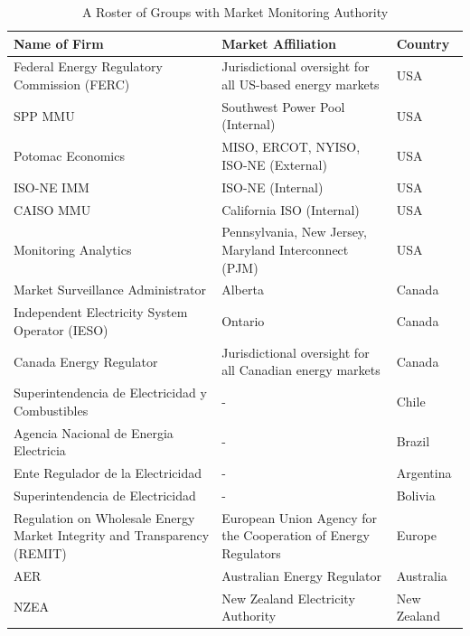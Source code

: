 \begin{table}[ht]
    \centering
    \begin{tabular}{|p{6cm}|p{5cm}|p{2cm}|}
        \hline
        \textbf{Name of Firm} & \textbf{Market Affiliation} & \textbf{Country} \\
        \hline
        Federal Energy Regulatory Commission (FERC) & Jurisdictional oversight for all US-based energy markets & USA \\
        \hline
        SPP MMU & Southwest Power Pool (Internal) & USA  \\
        \hline
        Potomac Economics & MISO, ERCOT, NYISO, ISO-NE (External) & USA \\
        \hline
        ISO-NE IMM & ISO-NE (Internal) & USA \\
        \hline
        CAISO MMU & California ISO (Internal) & USA \\
        \hline
        Monitoring Analytics & Pennsylvania, New Jersey, Maryland Interconnect (PJM) & USA \\
        \hline
        Market Surveillance Administrator & Alberta & Canada \\
        \hline
        Independent Electricity System Operator (IESO) & Ontario & Canada \\
        \hline
        Canada Energy Regulator & Jurisdictional oversight for all Canadian energy markets & Canada \\
        \hline
        Superintendencia de Electricidad y Combustibles & - & Chile \\
        \hline
        Agencia Nacional de Energia Electricia & - & Brazil \\
        \hline
        Ente Regulador de la Electricidad & - & Argentina \\
        \hline
        Superintendencia de Electricidad & - & Bolivia \\
        \hline
        Regulation on Wholesale Energy Market Integrity and Transparency (REMIT) & European Union Agency for the Cooperation of Energy Regulators & Europe \\
        \hline
        AER & Australian Energy Regulator & Australia \\
        \hline
        NZEA & New Zealand Electricity Authority & New Zealand \\
        \hline
    \end{tabular}
    \caption{A Roster of Groups with Market Monitoring Authority}
    \label{tab:mmu-roster}
\end{table}

